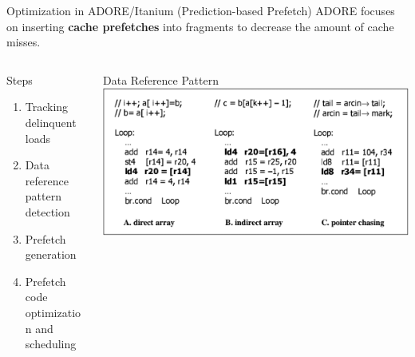 \documentclass[aspectratio=169,xcolor=x11names]{beamer}
\begin{document}
	\begin{frame}{Optimization in ADORE/Itanium (Prediction-based Prefetch)}
		ADORE focuses on inserting \textbf{cache prefetches} into fragments to decrease the amount of cache misses. %
		
		\begin{columns}
			\begin{column}[T]{0.42\linewidth}
				\begin{block}{Steps}
					\begin{enumerate}
						\item Tracking \alert{delinquent loads} %
						\item Data reference pattern detection
						\item Prefetch generation %
						\item Prefetch code optimization and scheduling %
					\end{enumerate}
				\end{block}
			\end{column}
			\begin{column}[T]{0.58\linewidth}
				\begin{exampleblock}{Data Reference Pattern}
					\includegraphics[width=\textwidth]{ADORE-pattern}
				\end{exampleblock}
			\end{column}
		\end{columns}
	\end{frame}
\end{document}

